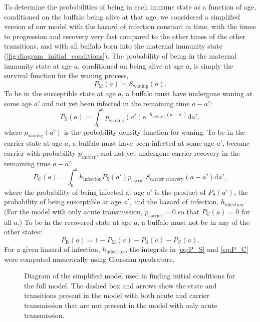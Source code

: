 \documentclass[12pt, UKenglish]{article}  %
\newcommand{\md}{\mathrm{d}}
\newcommand{\me}{\mathrm{e}}
\begin{document}
To determine the probabilities of being in each immune state as a
function of age, conditioned on the buffalo being alive at that age, we
considered a simplified version of our model with the hazard of
infection constant in time, with the times to progression and recovery
very fast compared to the other times of the other transitions, and
with all buffalo born into the maternal immunity state
(\autoref{fig:diagram_initial_conditions}). The probability of being
in the maternal immunity state at age $a$, conditioned on being alive
at age $a$, is simply the survival function for the waning process,
\begin{equation}
  \label{eq:P_M}
  P_{\mathrm{M}}(a) = S_{\text{waning}}(a).
\end{equation}
To be in the susceptible state at age $a$, a buffalo must have
undergone waning at some age $a'$ and not yet been infected in the
remaining time $a - a'$:
\begin{equation}
  \label{eq:P_S}
  P_{\mathrm{S}}(a) =
  \int_0^a p_{\text{waning}}(a')
  \me^{- h_{\text{infection}} (a - a')} \md a',
\end{equation}
where $p_{\text{waning}}(a')$ is the probability density function for
waning. To be in the carrier state at age $a$, a buffalo must have
been infected at some age $a'$, become carrier with probability
$p_{\text{carrier}}$, and not yet undergone carrier recovery in the
remaining time $a - a'$:
\begin{equation}
  \label{eq:P_C}
  P_{\mathrm{C}}(a) =
  \int_0^a h_{\text{infection}} P_{\mathrm{S}}(a')
  p_{\text{carrier}}
  S_{\text{carrier recovery}}(a - a') \md a',
\end{equation}
where the probability of being infected at age $a'$ is the product of
$P_{\mathrm{S}}(a')$, the probability of being susceptible at age
$a'$, and the hazard of infection, $h_{\text{infection}}$.
(For the model with only acute transmission, $p_{\text{carrier}} = 0$
so that $P_{\mathrm{C}}(a) = 0$ for all $a$.)
To be in the recovered state at age $a$, a buffalo must not be in any
of the other states:
\begin{equation}
  P_{\mathrm{R}}(a) = 1 - P_{\mathrm{M}}(a)
  - P_{\mathrm{S}}(a) - P_{\mathrm{C}}(a).
\end{equation}
For a given hazard of infection, $h_{\text{infection}}$, the
integrals in \eqref{eq:P_S} and \eqref{eq:P_C} were computed
numerically using Gaussian quadrature.

\begin{figure}
  \centering
  \textsf{}
  \caption{Diagram of the simplified model used in finding initial
    conditions for the full model. The dashed box and arrows show the
    state and transitions present in the model with both acute and
    carrier transmission that are not present in the model with only
    acute transmission.}
  \label{fig:diagram_initial_conditions}
\end{figure}
\end{document}
